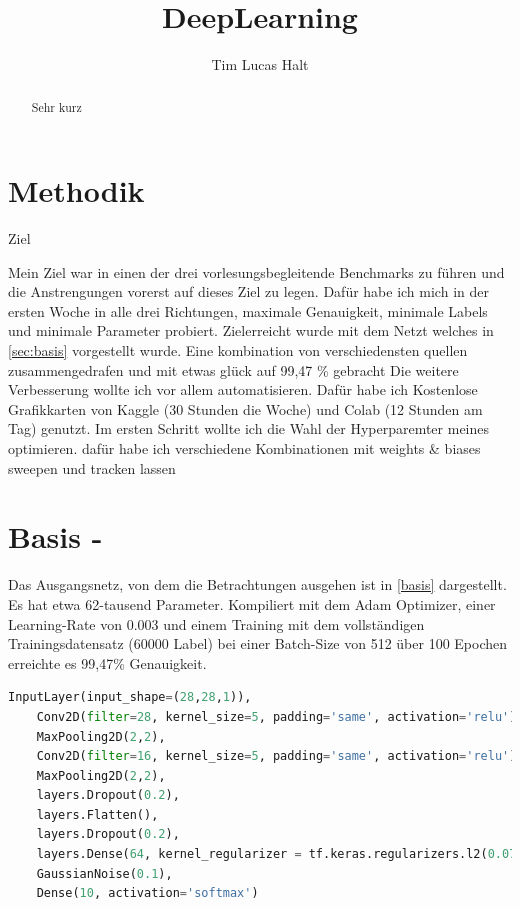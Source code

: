 \documentclass[
fontsize=12pt,					%
paper=a4,						%
twoside=true, 					%
listof=totoc, 					%
bibliography=totoc,				%
titlepage, 						%
headsepline, 					%
DIV=12,							%
BCOR=6mm,						%
cleardoublepage=empty,			%
parskip,							%
ngerman
]{scrartcl}
\title{DeepLearning}
\author{Tim Lucas Halt}
\begin{document}
\maketitle

\begin{abstract}

Sehr kurz

\end{abstract}

\section{Methodik}

Ziel 

Mein Ziel war in einen der drei vorlesungsbegleitende Benchmarks zu führen und die Anstrengungen vorerst auf dieses Ziel zu legen.
Dafür habe ich mich in der ersten Woche in alle drei Richtungen, maximale Genauigkeit, minimale Labels und minimale Parameter probiert.
Zielerreicht wurde mit dem Netzt welches in \autoref{sec:basis} vorgestellt wurde. Eine kombination von verschiedensten quellen zusammengedrafen und mit etwas glück auf 99,47 \% gebracht
Die weitere Verbesserung wollte ich vor allem automatisieren.
Dafür habe ich Kostenlose Grafikkarten von Kaggle (30 Stunden die Woche) und Colab (12 Stunden am Tag) genutzt. 
Im ersten Schritt wollte ich die Wahl der Hyperparemter meines optimieren. dafür habe ich verschiedene Kombinationen mit weights \& biases sweepen und tracken lassen

\section{Basis -  }
\label{sec:basis}

Das Ausgangsnetz, von dem die Betrachtungen ausgehen ist in \autoref{basis} dargestellt. Es hat etwa 62-tausend Parameter. Kompiliert mit dem Adam Optimizer, einer Learning-Rate von 0.003 und einem Training mit dem vollständigen Trainingsdatensatz (60000 Label) bei einer Batch-Size von 512 über 100 Epochen erreichte es 99,47\% Genauigkeit.

\begin{lstlisting}[language=Python, caption=Python-Code, label=basis]
	InputLayer(input_shape=(28,28,1)),
	Conv2D(filter=28, kernel_size=5, padding='same', activation='relu'),
	MaxPooling2D(2,2),
	Conv2D(filter=16, kernel_size=5, padding='same', activation='relu'),
	MaxPooling2D(2,2),
	layers.Dropout(0.2),
	layers.Flatten(),
	layers.Dropout(0.2),
	layers.Dense(64, kernel_regularizer = tf.keras.regularizers.l2(0.07), activation = 'relu'),
	GaussianNoise(0.1),
	Dense(10, activation='softmax')
\end{lstlisting}
\end{document}

